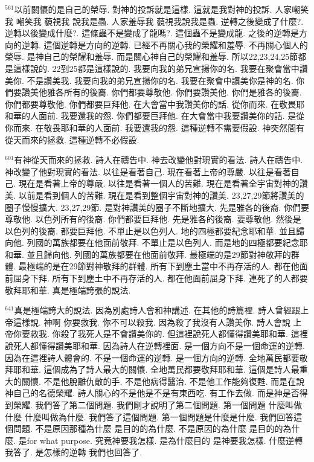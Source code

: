 \documentclass{book}
\begin{document}
$^{561}$以前關懷的是自己的榮辱.
對神的投訴就是這樣.
這就是我對神的投訴.
人家嘲笑我 嘲笑我 藐視我 說我是蟲.
人家羞辱我 藐視我說我是蟲.
逆轉之後變成了什麼?.
逆轉以後變成什麼?.
這條蟲不是變成了龍嗎?.
這個蟲不是變成龍.
之後的逆轉是方向的逆轉.
這個逆轉是方向的逆轉.
已經不再關心我的榮耀和羞辱.
不再關心個人的榮辱.
是神自己的榮耀和羞辱.
而是關心神自己的榮耀和羞辱.
所以22,23,24,25節都是這樣說的.
22到25都是這樣說的.
我要向我的弟兄宣揚你的名.
我要在聚會當中讚美你.
不是讚美我.
我要向我的弟兄宣揚你的名.
我要在聚會中讚美你是神的名.
你們要讚美他雅各所有的後裔.
你們都要尊敬他.
你們要讚美他.
你們是雅各的後裔.
你們都要尊敬他.
你們都要巨拜他.
在大會當中我讚美你的話.
從你而來.
在敬畏耶和華的人面前.
我要還我的怨.
你們都要巨拜他.
在大會當中我要讚美你的話.
是從你而來.
在敬畏耶和華的人面前.
我要還我的怨.
這種逆轉不需要假設.
神突然間有從天而來的拯救.
這種逆轉不必假設.

$^{601}$有神從天而來的拯救.
詩人在禱告中.
神去改變他對現實的看法.
詩人在禱告中.
神改變了他對現實的看法.
以往是看著自己.
現在看著上帝的尊嚴.
以往是看著自己.
現在是看著上帝的尊嚴.
以往是看著一個人的苦難.
現在是看著全宇宙對神的讚美.
以前是看到個人的苦難.
現在是看到整個宇宙對神的讚美.
23,27,29節將讚美的圈子慢慢擴大.
23,27,29節.
是對神讚美的圈子不斷地擴大.
先是雅各的後裔.
你們要尊敬他.
以色列所有的後裔.
你們都要巨拜他.
先是雅各的後裔.
要尊敬他.
然後是以色列的後裔.
都要巨拜他.
不單止是以色列人.
地的四極都要紀念耶和華.
並且歸向他.
列國的萬族都要在他面前敬拜.
不單止是以色列人.
而是地的四極都要紀念耶和華.
並且歸向他.
列國的萬族都要在他面前敬拜.
最極端的是29節對神敬拜的群體.
最極端的是在29節對神敬拜的群體.
所有下到塵土當中不再存活的人.
都在他面前屈身下拜.
所有下到塵土中不再存活的人.
都在他面前屈身下拜.
連死了的人都要敬拜耶和華.
真是極端誇張的說法.

$^{641}$真是極端誇大的說法.
因為別處詩人會和神講述.
在其他的詩篇裡.
詩人曾經跟上帝這樣說.
神啊 你要救我.
你不可以殺我.
因為殺了我沒有人讚美你.
詩人會說 上帝你要救我.
你殺了我死人是不會讚美你的.
但這裡說死人都懂得讚美耶和華.
這裡說死人都懂得讚美耶和華.
因為詩人在逆轉裡面.
是一個方向不是一個命運的逆轉.
因為在這裡詩人體會的.
不是一個命運的逆轉.
是一個方向的逆轉.
全地萬民都要敬拜耶和華.
這個成為了詩人最大的關懷.
全地萬民都要敬拜耶和華.
這個是詩人最重大的關懷.
不是他脫離仇敵的手.
不是他病得醫治.
不是他工作能夠復甦.
而是在說神自己的名德榮耀.
詩人關心的不是他是不是有東西吃.
有工作去做.
而是神是否得到榮耀.
我們答了第二個問題.
我們剛才說明了第二個問題.
第一個問題 什麼叫做什麼 什麼叫做為什麼.
我們答了這個問題.
第一個問題是什麼是什麼.
我們回答這個問題.
不是原因那種為什麼 是目的的為什麼.
不是原因的為什麼 是目的的為什麼.
是for what purpose.
究竟神要我怎樣.
是為什麼目的 是神要我怎樣.
什麼逆轉 我答了.
是怎樣的逆轉 我們也回答了.
\end{document}
